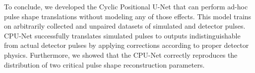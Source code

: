 To conclude, we developed the Cyclic Positional U-Net that can perform ad-hoc pulse shape translations without modeling any of those effects. This model trains on arbitrarily collected and unpaired datasets of simulated and detector pulses. CPU-Net successfully translates simulated pulses to outputs indistinguishable from actual detector pulses by applying corrections according to proper detector physics. Furthermore, we showed that the CPU-Net correctly reproduces the distribution of two critical pulse shape reconstruction parameters. 
